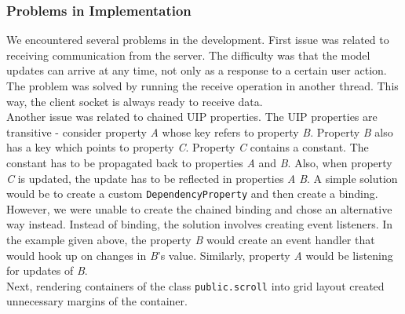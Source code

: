 \subsubsection{Problems in Implementation}
We encountered several problems in the development. First issue was related to receiving communication from the server. The difficulty was that the model updates can arrive at any time, not only as a response to a certain user action. The problem was solved by running the receive operation in another thread. This way, the client socket is always ready to receive data.\\

Another issue was related to chained UIP properties. The UIP properties are transitive - consider property \emph{A} whose key refers to property \emph{B}. Property \emph{B} also has a key which points to property \emph{C}. Property \emph{C} contains a constant. The constant has to be propagated back to properties \emph{A} and \emph{B}. Also, when property \emph{C} is updated, the update has to be reflected in properties \emph{A} \emph{B}.
A simple solution would be to create a custom \texttt{DependencyProperty} and then create a binding. However, we were unable to create the chained binding and chose an alternative way instead. Instead of binding, the solution involves creating event listeners. In the example given above, the property \emph{B} would create an event handler that would hook up on changes in \emph{B}'s value. Similarly, property \emph{A} would be listening for updates of \emph{B}.\\

Next, rendering containers of the class \texttt{public.scroll} into grid layout created unnecessary margins of the container.